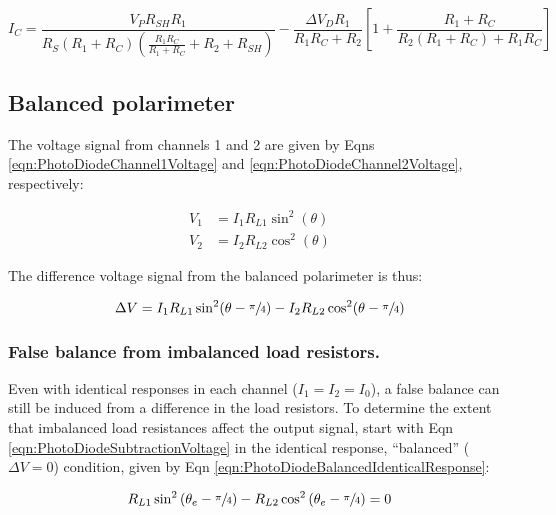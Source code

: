 \documentclass[../PaulGanssle-Thesis.tex]{subfiles}
\begin{document}
\begin{equation}
I_C = \frac{V_{P}R_{SH}R_{1}}{R_{S}\left(R_{1}+R_{C}\right)\left(\frac{R_{1}R_{C}}{R_{1} + R_{C}} + R_{2} + R_{SH}\right)} - \frac{\Delta V_{D} R_{1}}{R_{1}R_{C} + R_{2}}\left[1 + \frac{R_{1} + R_{C}}{R_{2}(R_{1} + R_{C}) + R_{1}R_{C}}\right]
\end{equation}

\subsection{Balanced polarimeter}
\label{proofs.circuits.balancedpolarimeter}
The voltage signal from channels 1 and 2 are given by Eqns \ref{eqn:PhotoDiodeChannel1Voltage} and \ref{eqn:PhotoDiodeChannel2Voltage}, respectively:

\begin{align}
\label{eqn:PhotoDiodeChannel1Voltage}
V_{1} & = I_{1}R_{L1}\sin^{2}(\theta) \\
\label{eqn:PhotoDiodeChannel2Voltage}
V_{2} & = I_{2}R_{L2}\cos^{2}(\theta)
\end{align}

The difference voltage signal from the balanced polarimeter is thus:

\begin{equation}
\label{eqn:PhotoDiodeSubtractionVoltage}
\Delta V = I_{1}R_{L1}\sin^2(\theta - \sfrac{\pi}{4}) - I_{2}R_{L2}\cos^2(\theta - \sfrac{\pi}{4})
\end{equation}

\subsubsection{False balance from imbalanced load resistors.}
\label{proofs.circuits.balancedpolarimeter.imbalancedresistors}
Even with identical responses in each channel ($I_{1} = I_{2} = I_{0}$), a false balance can still be induced from a difference in the load resistors. To determine the extent that imbalanced load resistances affect the output signal, start with Eqn \ref{eqn:PhotoDiodeSubtractionVoltage} in the identical response, ``balanced'' ($\Delta V = 0$) condition, given by Eqn \ref{eqn:PhotoDiodeBalancedIdenticalResponse}:

\begin{equation}
\label{eqn:PhotoDiodeBalancedIdenticalResponse}
R_{L1}\sin^2\left(\theta_e - \sfrac{\pi}{4}\right) - R_{L2}\cos^2\left(\theta_e-\sfrac{\pi}{4}\right) = 0
\end{equation} 
\end{document}
